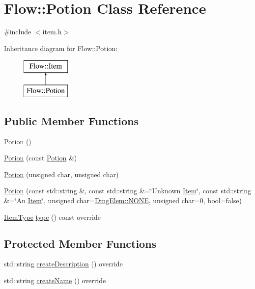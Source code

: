 \hypertarget{class_flow_1_1_potion}{}\section{Flow\+:\+:Potion Class Reference}
\label{class_flow_1_1_potion}


{\ttfamily \#include $<$item.\+h$>$}

Inheritance diagram for Flow\+:\+:Potion\+:\begin{figure}[H]
\begin{center}
\leavevmode
\includegraphics[height=2.000000cm]{class_flow_1_1_potion}
\end{center}
\end{figure}
\subsection*{Public Member Functions}
\begin{DoxyCompactItemize}
\item 
\hyperlink{class_flow_1_1_potion_a630878668d1f8270f96d6d43c5dfa983}{Potion} ()
\item 
\hyperlink{class_flow_1_1_potion_a22df1a4e224e653a6a37bff5b1f10983}{Potion} (const \hyperlink{class_flow_1_1_potion}{Potion} \&)
\item 
\hyperlink{class_flow_1_1_potion_acbe254ee9f64b11f23fb75e2486d4dbe}{Potion} (unsigned char, unsigned char)
\item 
\hyperlink{class_flow_1_1_potion_a2ed91ff209bdb8d665a65005f714453d}{Potion} (const std\+::string \&, const std\+::string \&=\char`\"{}Unknown \hyperlink{class_flow_1_1_item}{Item}\char`\"{}, const std\+::string \&=\char`\"{}An \hyperlink{class_flow_1_1_item}{Item}\char`\"{}, unsigned char=\hyperlink{namespace_flow_1_1_dmg_elem_a2c7180f371963927ddcc5b333568a33b}{Dmg\+Elem\+::\+N\+O\+NE}, unsigned char=0, bool=false)
\item 
\hyperlink{namespace_flow_a09368c0b65b3d1bc5c227ed1046c8bca}{Item\+Type} \hyperlink{class_flow_1_1_potion_a5594ca2469cc324d4fc163cc96955d42}{type} () const override
\end{DoxyCompactItemize}
\subsection*{Protected Member Functions}
\begin{DoxyCompactItemize}
\item 
std\+::string \hyperlink{class_flow_1_1_potion_a94d1c25d72b46c6e9d8eeb9880bdeca5}{create\+Description} () override
\item 
std\+::string \hyperlink{class_flow_1_1_potion_ab21ab2dbee0ff4bb9dbe9cba6689ea34}{create\+Name} () override
\end{DoxyCompactItemize}
